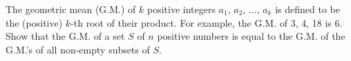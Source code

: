 The geometric mean (G.M.) of $k$ positive integers $a_1$,  $a_2$,  $\dots$,  $a_k$ is defined to be the (positive) $k$-th root of their product.  For example, the G.M. of 3, 4, 18 is 6.  Show that the G.M. of a set $S$ of $n$ positive numbers is equal to the G.M. of the G.M.'s of all non-empty subsets of $S$.
